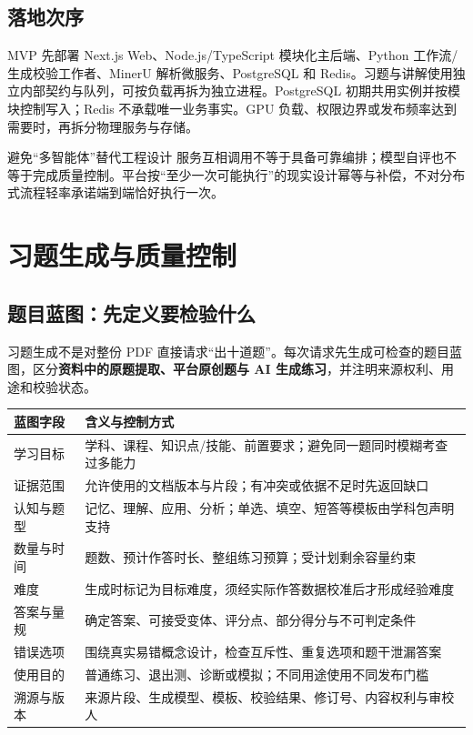 \documentclass[UTF8,a4paper,11pt,fontset=none]{ctexart}
\newcommand{\cth}[1]{\textbf{\sffamily #1}}
\newcommand{\newsec}[1]{\clearpage\section{#1}}
\newenvironment{tbl}{\par\vspace{3pt}\small\noindent\ignorespaces}{\unskip\par\vspace{5pt}}
\begin{document}
\subsection{落地次序}
MVP 先部署 Next.js Web、Node.js/TypeScript 模块化主后端、Python 工作流/生成校验工作者、MinerU 解析微服务、PostgreSQL 和 Redis。习题与讲解使用独立内部契约与队列，可按负载再拆为独立进程。PostgreSQL 初期共用实例并按模块控制写入；Redis 不承载唯一业务事实。GPU 负载、权限边界或发布频率达到需要时，再拆分物理服务与存储。

\begin{caution}{避免“多智能体”替代工程设计}
服务互相调用不等于具备可靠编排；模型自评也不等于完成质量控制。平台按“至少一次可能执行”的现实设计幂等与补偿，不对分布式流程轻率承诺端到端恰好执行一次。
\end{caution}

\newsec{习题生成与质量控制}
\subsection{题目蓝图：先定义要检验什么}
习题生成不是对整份 PDF 直接请求“出十道题”。每次请求先生成可检查的题目蓝图，区分\textbf{资料中的原题提取、平台原创题与 AI 生成练习}，并注明来源权利、用途和校验状态。

\begin{tbl}
\begin{tabularx}{\linewidth}{@{}L{30mm}Y@{}}
\toprule
\cth{蓝图字段}&\cth{含义与控制方式}\\\midrule
学习目标&学科、课程、知识点/技能、前置要求；避免同一题同时模糊考查过多能力\\
证据范围&允许使用的文档版本与片段；有冲突或依据不足时先返回缺口\\
认知与题型&记忆、理解、应用、分析；单选、填空、短答等模板由学科包声明支持\\
数量与时间&题数、预计作答时长、整组练习预算；受计划剩余容量约束\\
难度&生成时标记为目标难度，须经实际作答数据校准后才形成经验难度\\
答案与量规&确定答案、可接受变体、评分点、部分得分与不可判定条件\\
错误选项&围绕真实易错概念设计，检查互斥性、重复选项和题干泄漏答案\\
使用目的&普通练习、退出测、诊断或模拟；不同用途使用不同发布门槛\\
溯源与版本&来源片段、生成模型、模板、校验结果、修订号、内容权利与审校人\\
\bottomrule
\end{tabularx}
\end{tbl}
\end{document}
